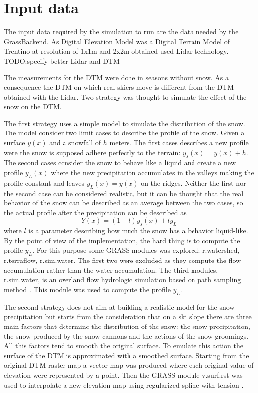 \documentclass[12pt,a4paper,twoside]{book}
\begin{document}
\section{Input data}
The input data required by the simulation to run are the data needed by the GrassBackend. As Digital Elevation Model was a Digital Terrain Model of Trentino at resolution of 1x1m and 2x2m obtained used Lidar technology. TODO:specify better Lidar and DTM

The measurements for the DTM were done in seasons without snow. As a consequence the DTM on which real skiers move is different from the DTM obtained with the Lidar. Two strategy was thought to simulate the effect of the snow on the DTM.

The first strategy uses a simple model to simulate the distribution of the snow. The model consider two limit cases to describe the profile of the snow. Given a surface $y(x)$ and a snowfall of $h$ meters. The first cases describes a new profile were the snow is supposed adhere perfectly to the terrain: $y_s(x)=y(x)+h$. The second cases consider the snow to behave like a liquid and create a new profile $y_L(x)$ where the new precipitation accumulates in the valleys making the profile constant and leaves $y_L(x)=y(x)$ on the ridges. Neither the first nor the second case can be considered realistic, but it can be thought that the real behavior of the snow can be described as an average between the two cases, so the actual profile after the precipitation can be described as
\begin{equation}
Y(x)=(1-l)y_s(x)+ly_L
\end{equation}
where $l$ is a parameter describing how much the snow has a behavior liquid-like. By the point of view of the implementation, the hard thing is to compute the profile $y_L$. For this purpose some GRASS modules was explored: r.watershed, r.terraflow, r.sim.water. The first two were excluded as they compute the flow accumulation rather than the water accumulation. The third modules, r.sim.water, is an overland flow hydrologic simulation based on path sampling method \cite{mit2004}. This module was used to compute the profile $y_L$.

The second strategy does not aim at building a realistic model for the snow precipitation but starts from the consideration that on a ski slope there are three main factors that determine the distribution of the snow: the snow precipitation, the snow produced by the snow cannons and the actions of the snow groomings. All this factors tend to smooth the original surface. To emulate this action the surface of the DTM is approximated with a smoothed surface. Starting from the original DTM raster map a vector map was produced where each original value of elevation were represented by a point. Then the GRASS module v.surf.rst was used to interpolate a new elevation map using regularized spline with tension \cite{mit2005}.
\end{document}
